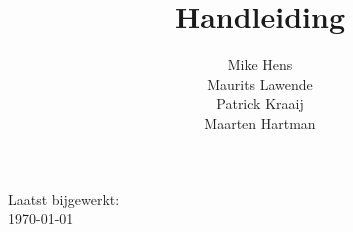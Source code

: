 \documentclass[11pt]{article}
\title{Handleiding \customerdomainuc}
\author{Mike Hens \\ Maurits Lawende \\ Patrick Kraaij \\ Maarten Hartman}
\date{}
\begin{document}
\maketitle
\begin{center}

Laatst bijgewerkt: \\ \ddmmyyyydate \today
\end{center}
\pagebreak

\renewcommand*\contentsname{Inhoudsopgave}
\tableofcontents
\pagebreak

%






\clearpage

\appendix
\addappheadtotoc




%
\end{document}
